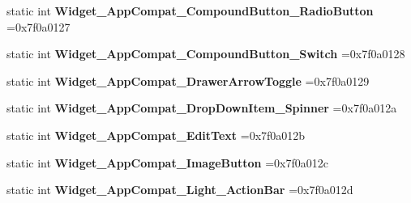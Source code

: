 \begin{DoxyCompactItemize}
\item 
\mbox{\label{classandroid_1_1support_1_1v7_1_1recyclerview_1_1R_1_1style_ab079a43de5d34f5178d7db7746ea94ce}} 
static int {\bfseries Widget\+\_\+\+App\+Compat\+\_\+\+Compound\+Button\+\_\+\+Radio\+Button} =0x7f0a0127
\item 
\mbox{\label{classandroid_1_1support_1_1v7_1_1recyclerview_1_1R_1_1style_a214d102a08ed70bf8b10cc8ba2043d74}} 
static int {\bfseries Widget\+\_\+\+App\+Compat\+\_\+\+Compound\+Button\+\_\+\+Switch} =0x7f0a0128
\item 
\mbox{\label{classandroid_1_1support_1_1v7_1_1recyclerview_1_1R_1_1style_a8cbba6aac424823752f3ad8c5a2ed0c5}} 
static int {\bfseries Widget\+\_\+\+App\+Compat\+\_\+\+Drawer\+Arrow\+Toggle} =0x7f0a0129
\item 
\mbox{\label{classandroid_1_1support_1_1v7_1_1recyclerview_1_1R_1_1style_a46cf125f640f59da2c2c0c8922597f72}} 
static int {\bfseries Widget\+\_\+\+App\+Compat\+\_\+\+Drop\+Down\+Item\+\_\+\+Spinner} =0x7f0a012a
\item 
\mbox{\label{classandroid_1_1support_1_1v7_1_1recyclerview_1_1R_1_1style_a92bdd3d6fd918307d3ee8d288d68436b}} 
static int {\bfseries Widget\+\_\+\+App\+Compat\+\_\+\+Edit\+Text} =0x7f0a012b
\item 
\mbox{\label{classandroid_1_1support_1_1v7_1_1recyclerview_1_1R_1_1style_a09c497d14a023a733e5c5b77b41e50a4}} 
static int {\bfseries Widget\+\_\+\+App\+Compat\+\_\+\+Image\+Button} =0x7f0a012c
\item 
\mbox{\label{classandroid_1_1support_1_1v7_1_1recyclerview_1_1R_1_1style_affac96624a3811960a82a70a3346ec81}} 
static int {\bfseries Widget\+\_\+\+App\+Compat\+\_\+\+Light\+\_\+\+Action\+Bar} =0x7f0a012d
\item 
\mbox{\label{classandroid_1_1support_1_1v7_1_1recyclerview_1_1R_1_1style_a48923565aadd6bf6946d6fee6eff09df}} 

\end{DoxyCompactItemize}
